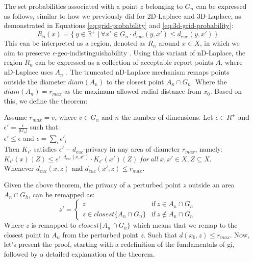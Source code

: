 The set probabilities associated with a point $z$ belonging to $G_n$ can be expressed as follows, similar to how we previously did for 2D-Laplace and 3D-Laplace, as demonstrated in Equations \ref{eq:grid-probability} and \ref{eq:3d-grid-probability}:
\begin{equation}
R_n(x) = \{ \ y \in \mathbb{R}^+ \ | \ \forall x' \in G_n \cdot d_{euc}(y, x') \leq d_{euc}(y, x') \ \}
\end{equation}
This can be interpreted as a region, denoted as $R_n$ around $x \in X$, in which we aim to preserve $\epsilon$-geo-indistinguishability \citep{9646489}.
Using this variant of nD-Laplace, the region $R_n$ can be expressed as a collection of acceptable report points $A$, where nD-Laplace uses $A_n$ \citep{DBLP:journals/corr/abs-1212-1984}.
The truncated nD-Laplace mechanism remaps points outside the diameter $diam(A_n)$ to the closest point $A_n \cap G_n$. 
Where the $diam(A_n) = r_{max}$ as the maximum allowed radial distance from $x_0$. \newline
Based on this, we define the theorem:
\begin{theorem}
Assume  $r_{max} = v$, where $v \in G_n$ and $n$ the number of dimensions. Let $\epsilon \in R^+$ and $\epsilon' = \frac{\epsilon}{|G_n|}$ such that: \\
  $\epsilon' \leq \epsilon$ and $\epsilon = \sum_i{\epsilon'_i}$ \\
  Then $K_{\epsilon'}$ satisfies $\epsilon'-d_{euc}$-privacy in any area of diameter $r_{max}$, namely: \\ 
  $K_{\epsilon'}(x)(Z) \leq e^{\epsilon \cdot d_{euc} (x, x')} \cdot K_{\epsilon'}(x')(Z) \ for \ all \ x, x' \in X, Z \subseteq X$.  \\
  Whenever $d_{euc}(x, z)$ and $d_{euc}(x', z) \leq r_{max}$.
  \label{theorem:nd-laplace-truncation}
\end{theorem}
Given the above theorem, the privacy of a perturbed point $z$ outside an area $A_n \cap G_h$, can be remapped as:
\begin{equation}
z' = 
\begin{cases}
        z & \text{if} \ z \in A_n \cap G_n \\ 
        z \in closest \{ A_n \cap G_n \}  & \text{if} \ z \notin A_n \cap G_n
    \end{cases}    
\end{equation}
Where $z$ is remapped to $closest \{ A_n \cap G_n \}$ which means that we remap to the closest point in $A_n$ from the perturbed point $z$. Such that $d(x_0, z) \leq r_{max}$.  \newline
Now, let's present the proof, starting with a redefinition of the fundamentals of \gls{gi}, followed by a detailed explanation of the theorem. \newline


